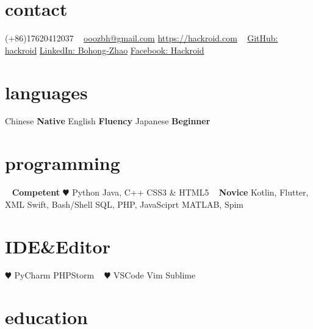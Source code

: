 \documentclass[hidelinks__VERSION__]{adamyi-cv}
\begin{document}



\begin{aside} %
\section{contact}
(+86)17620412037
~
\href{mailto:ooozbh@gmail.com}{ooozbh@gmail.com}
\href{https://hackroid.com}{https://hackroid.com}
~
\href{https://github.com/hackroid}{GitHub: hackroid}
\href{https://www.linkedin.com/in/%E5%8D%9A%E5%BC%98-%E8%B5%B5-b7ab09136/}{LinkedIn: Bohong-Zhao}
\href{https://www.facebook.com/Hackro1d}{Facebook: Hackroid}
\section{languages}
Chinese \textbf{Native}
English \textbf{Fluency}
Japanese \textbf{Beginner}
\section{programming}
~
\textbf{Competent}
{\color{red} $\varheart$} Python
Java, C++
CSS3 \& HTML5
~
\textbf{Novice}
Kotlin, Flutter, XML
Swift, Bash/Shell
SQL, PHP, JavaSciprt
MATLAB, Spim
\section{IDE\&Editor}
{\color{red} $\varheart$} PyCharm
PHPStorm
~
{\color{red} $\varheart$} VSCode
Vim
Sublime
\versionsection
\end{aside}


\section{education}
\end{document}
